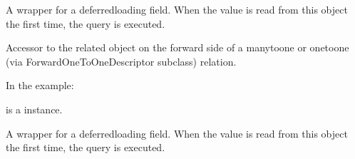 \documentclass[letterpaper,10pt,spanish]{sphinxmanual}
\begin{document}
\begin{fulllineitems}
\begin{fulllineitems}

\pysigstartsignatures
{}
\pysigstopsignatures
\sphinxAtStartPar
A wrapper for a deferred\sphinxhyphen{}loading field. When the value is read from this
object the first time, the query is executed.

\end{fulllineitems}



\begin{fulllineitems}

\pysigstartsignatures
{}
\pysigstopsignatures
\sphinxAtStartPar
Accessor to the related object on the forward side of a many\sphinxhyphen{}to\sphinxhyphen{}one or
one\sphinxhyphen{}to\sphinxhyphen{}one (via ForwardOneToOneDescriptor subclass) relation.

\sphinxAtStartPar
In the example:

\begin{sphinxVerbatim}[commandchars=\\\{\}]
 
       
\end{sphinxVerbatim}

\sphinxAtStartPar
{} is a  instance.

\end{fulllineitems}



\begin{fulllineitems}

\pysigstartsignatures
{}
\pysigstopsignatures
\end{fulllineitems}



\begin{fulllineitems}

\pysigstartsignatures
{}
\pysigstopsignatures
\sphinxAtStartPar
A wrapper for a deferred\sphinxhyphen{}loading field. When the value is read from this
object the first time, the query is executed.


\end{fulllineitems}
\end{fulllineitems}
\end{document}
